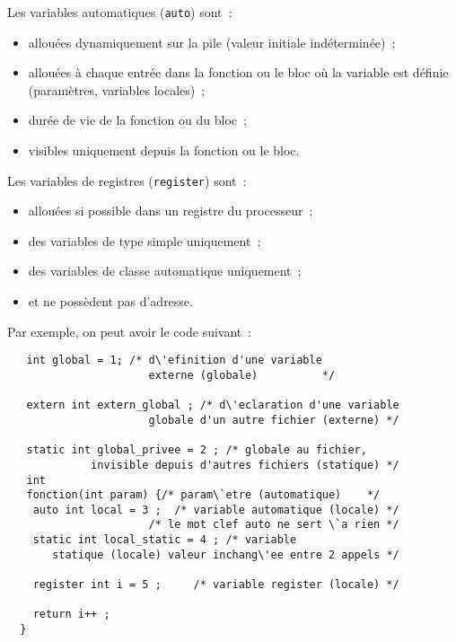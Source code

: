 \begin{frame}
  Les variables automatiques ({\tt auto}) sont~:
  \begin{itemize}
  \item allou\'ees dynamiquement sur la pile (valeur initiale
    ind\'etermin\'ee)~;
  \item allou\'ees \`a chaque entr\'ee dans la fonction ou le bloc
    o\`u la variable est d\'efinie (param\`etres, variables
    locales)~;
  \item dur\'ee de vie de la fonction ou du bloc~;
  \item visibles uniquement depuis la fonction ou le bloc.
  \end{itemize}
  \par\bigskip
  Les variables de registres ({\tt register}) sont~: 
  \begin{itemize}
  \item allou\'ees si possible dans un
    registre du processeur~;
  \item des variables de type simple uniquement~;
  \item des variables de classe automatique uniquement~;
  \item et ne poss\`edent pas d'adresse.
  \end{itemize}
\end{frame}
\begin{frame}[fragile]
  Par exemple, on peut avoir le code suivant~:
\begin{verbatim}
   int global = 1; /* d\'efinition d'une variable 
                      externe (globale)          */
                                    
   extern int extern_global ; /* d\'eclaration d'une variable
                      globale d'un autre fichier (externe) */

   static int global_privee = 2 ; /* globale au fichier,
             invisible depuis d'autres fichiers (statique) */
   int
   fonction(int param) {/* param\`etre (automatique)    */
    auto int local = 3 ;  /* variable automatique (locale) */
                      /* le mot clef auto ne sert \`a rien */
    static int local_static = 4 ; /* variable 
       statique (locale) valeur inchang\'ee entre 2 appels */

    register int i = 5 ;     /* variable register (locale) */

    return i++ ;
  }
\end{verbatim}
\end{frame}
